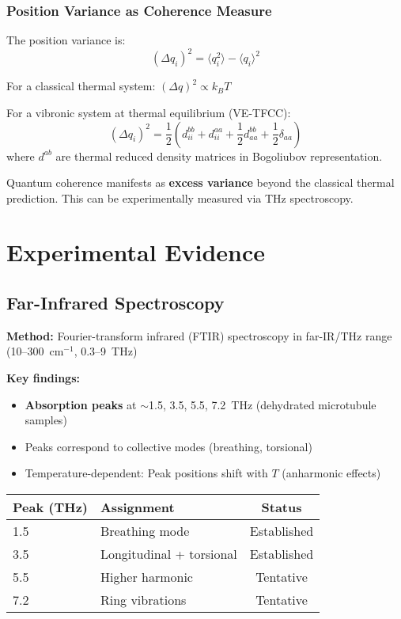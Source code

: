 \subsubsection{Position Variance as Coherence Measure}

The position variance is:
\begin{equation}
(\Delta q_i)^2 = \langle q_i^2 \rangle - \langle q_i \rangle^2
\label{eq:position-variance}
\end{equation}

For a classical thermal system: $(\Delta q)^2 \propto k_B T$

For a vibronic system at thermal equilibrium (VE-TFCC):
\begin{equation}
(\Delta q_i)^2 = \frac{1}{2} \left( d_{ii}^{bb} + d_{ii}^{aa} + \frac{1}{2} d_{aa}^{bb} + \frac{1}{2} \delta_{aa} \right)
\label{eq:vibronic-variance}
\end{equation}
where $d^{ab}$ are thermal reduced density matrices in Bogoliubov representation.

\begin{keyconcept}
Quantum coherence manifests as \textbf{excess variance} beyond the classical thermal prediction. This can be experimentally measured via THz spectroscopy.
\end{keyconcept}

\section{Experimental Evidence}

\subsection{Far-Infrared Spectroscopy}

\textbf{Method:} Fourier-transform infrared (FTIR) spectroscopy in far-IR/THz range (10--300~cm$^{-1}$, 0.3--9~THz)

\textbf{Key findings:}
\begin{itemize}
\item \textbf{Absorption peaks} at $\sim$1.5, 3.5, 5.5, 7.2~THz (dehydrated microtubule samples)
\item Peaks correspond to collective modes (breathing, torsional)
\item Temperature-dependent: Peak positions shift with $T$ (anharmonic effects)
\end{itemize}

\begin{center}
\begin{tabular}{@{}llc@{}}
\toprule
\textbf{Peak (THz)} & \textbf{Assignment} & \textbf{Status} \\
\midrule
1.5 & Breathing mode & Established \\
3.5 & Longitudinal + torsional & Established \\
5.5 & Higher harmonic & Tentative \\
7.2 & Ring vibrations & Tentative \\
\bottomrule
\end{tabular}
\end{center}

